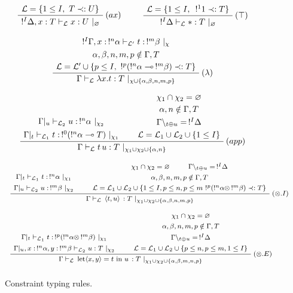 \begin{figure}[!ht]
\begin{mdframed}
	$$ $$
	$$ \mbox{
		\AxiomC{$\mathcal{L} = \{1 \le I, ~ T \prec: U\}$}
		\RightLabel{$(ax)$}
		\UnaryInfC{$!^I \Delta, x : T \vdash_\mathcal{L} x : U ~|_\varnothing$}
		\DisplayProof
		~~
		~~
		\AxiomC{$\mathcal{L} = \{1 \le I, ~ \,!^1 1 \prec: T \}$}
		\RightLabel{$(\top)$}
		\UnaryInfC{$!^I \Delta \vdash_\mathcal{L} * : T ~|_\varnothing$}
		\DisplayProof
	} $$
	$$ $$
	$$ \mbox{
		\AxiomC{$!^I\Gamma, x : \,!^n\alpha \vdash_\mathcal{L'} t : \,!^m\beta ~|_\chi$} \noLine
		\UnaryInfC{$\alpha, \beta, n, m, p \notin \Gamma, T$} \noLine
		\UnaryInfC{$\mathcal{L} = \mathcal{L'} \cup \{ p \le I, ~ !^p(!^n\alpha \multimap \,!^m\beta) \prec: T \}$}
		\RightLabel{$(\lambda)$}
		\UnaryInfC{$\Gamma \vdash_\mathcal{L} \lambda x.t : T ~|_{\chi \cup \{\alpha, \beta, n, m, p \}}$}
		\DisplayProof
	} $$
	$$ $$
	$$ \mbox{
		\AxiomC{$\Gamma|_u \vdash_{\mathcal{L}_2} u : \,!^n\alpha ~|_{\chi_2}$} \noLine
		\UnaryInfC{$\Gamma|_t \vdash_{\mathcal{L}_1} t : \,!^0(!^n\alpha \multimap T) ~|_{\chi_1}$} \noLine
		\AxiomC{$\chi_1 \cap \chi_2 = \varnothing$} \noLine
    \UnaryInfC{$\alpha, n \notin \Gamma, T$} \noLine
    \UnaryInfC{$\Gamma \backslash_{t \oplus u} = \,!^I \Delta$} \noLine
    \UnaryInfC{$\mathcal{L} = \mathcal{L}_1 \cup \mathcal{L}_2 \cup \{ 1 \le I \}$}
		\RightLabel{$(app)$}
		\BinaryInfC{$\Gamma \vdash_\mathcal{L} t \, u : T ~|_{\chi_1 \cup \chi_2 \cup \{ \alpha, n\}}$}
		\DisplayProof
	} $$
	$$ $$	
	$$ \mbox{
		\footnotesize
		\AxiomC{$\Gamma|_t \vdash_{\mathcal{L}_1} t : \, !^n\alpha ~|_{\chi_1}$} \noLine
		\UnaryInfC{$\Gamma|_u \vdash_{\mathcal{L}_2} u : \, !^m\beta ~|_{\chi_2}$}
		\AxiomC{$\chi_1 \cap \chi_2 = \varnothing$} \noLine
		\AxiomC{$\Gamma \backslash_{t \oplus u} = \,!^I \Delta$} \noLine
		\BinaryInfC{$\alpha, \beta, n, m, p \notin \Gamma, T$} \noLine
		\UnaryInfC{$\mathcal{L} = \mathcal{L}_1 \cup \mathcal{L}_2 \cup \{ 1 \le I, p \le n, p \le m ~!^p(!^n\alpha \otimes \,!^m\beta) \prec: T \}$}
		\RightLabel{$(\otimes.I)$}
		\BinaryInfC{$\Gamma \vdash_\mathcal{L} \, \pair{t}{u} \, : T ~|_{\chi_1 \cup \chi_2 \cup \{\alpha, \beta, n, m, p \}}$}
		\DisplayProof
	} $$
	$$ $$
	$$ \mbox{
		\footnotesize
		\AxiomC{$\Gamma|_t \vdash_{\mathcal{L}_1} t : \, !^p (!^n\alpha \otimes \,!^m\beta) ~|_{\chi_1}$} \noLine
		\UnaryInfC{$\Gamma|_u, x : \,!^n\alpha, y : \,!^m\beta \vdash_{\mathcal{L}_2} u : T ~|_{\chi_2}$}
		\AxiomC{$\chi_1 \cap \chi_2 = \varnothing$} \noLine
		\UnaryInfC{$\alpha, \beta, n, m, p \notin \Gamma, T$} \noLine
		\UnaryInfC{$\Gamma \backslash_{t \oplus u} = \,!^I \Delta$} \noLine
		\UnaryInfC{$\mathcal{L} = \mathcal{L}_1 \cup \mathcal{L}_2 \cup \{ p \le n, p \le m, 1 \le I \}$}
		\RightLabel{$(\otimes.E)$}
		\BinaryInfC{$\Gamma \vdash_\mathcal{L} \, \text{let} \pair{x}{y} = t ~ \text{in} ~ u \, : T ~|_{\chi_1 \cup \chi_2 \cup \{\alpha,\beta,m,n,p \}}$}
		\DisplayProof
	} $$
	$$ $$
\end{mdframed}
\caption{Constraint typing rules.}
\label{ctypeQP'}
\end{figure}

